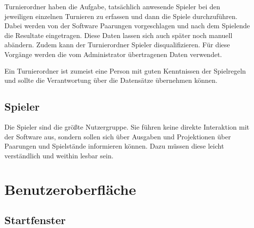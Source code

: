 \documentclass[11pt]{article}
\begin{document}
Turnierordner haben die Aufgabe, tatsächlich anwesende Spieler bei den jeweiligen einzelnen Turnieren zu erfassen und dann die Spiele durchzuführen. Dabei werden von der Software Paarungen vorgeschlagen und nach dem Spielende die Resultate eingetragen. Diese Daten lassen sich auch später noch manuell abändern. Zudem kann der Turnierordner Spieler disqualifizieren. Für diese Vorgänge werden die vom Administrator übertragenen Daten verwendet.

Ein Turnierordner ist zumeist eine Person mit guten Kenntnissen der Spielregeln und sollte die Verantwortung über die Datensätze übernehmen können.

\subsection{Spieler}

Die Spieler sind die größte Nutzergruppe. Sie führen keine direkte Interaktion mit der Software aus, sondern sollen sich über Ausgaben und Projektionen über Paarungen und Spielstände informieren können. Dazu müssen diese leicht verständlich und weithin lesbar sein.

\newpage

\section{Benutzeroberfläche}

\subsection{Startfenster}

\end{document}
